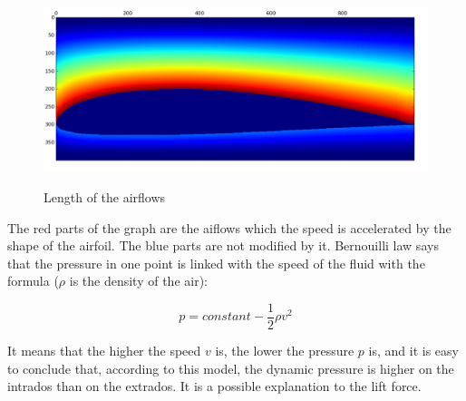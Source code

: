 \documentclass{article}
\begin{document}
\begin{figure}[h]
  \centering
  \caption{Length of the airflows}
  \includegraphics[width=13cm]{boeing_length}
  \label{boeing_length}
\end{figure}

The red parts of the graph are the aiflows which the speed is accelerated by the shape of the airfoil. The blue parts are not modified by it. Bernouilli law says that the pressure in one point is linked with the speed of the fluid with the formula ($\rho$ is the density of the air):

\begin{equation}
  p = constant - \frac{1}{2} \rho v^2
\end{equation}

It means that the higher the speed $v$ is, the lower the pressure $p$ is, and it is easy to conclude that, according to this model, the dynamic pressure is higher on the intrados than on the extrados. It is a possible explanation to the lift force.
\end{document}
